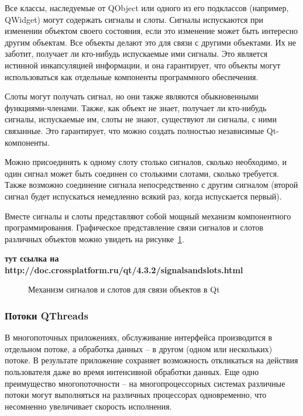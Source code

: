 Все классы, наследуемые от QObject или одного из его подклассов (например, QWidget) могут содержать сигналы и слоты. Сигналы испускаются при изменении объектом своего состояния, если это изменение может быть интересно другим объектам. Все объекты делают это для связи с другими объектами. Их не заботит, получает ли кто-нибудь испускаемые ими сигналы. Это является истинной инкапсуляцией информации, и она гарантирует, что объекты могут использоваться как отдельные компоненты программного обеспечения.

Слоты могут получать сигнал, но они также являются обыкновенными функциями-членами. Также, как объект не знает, получает ли кто-нибудь сигналы, испускаемые им, слоты не знают, существуют ли сигналы, с ними связанные. Это гарантирует, что можно создать полностью независимые Qt-компоненты.

Можно присоединять к одному слоту столько сигналов, сколько необходимо, и один сигнал может быть соединен со столькими слотами, сколько требуется. Также возможно соединение сигнала непосредственно с другим сигналом (второй сигнал будет испускаться немедленно всякий раз, когда испускается первый).

Вместе сигналы и слоты представляют собой мощный механизм компонентного программирования. Графическое представление связи сигналов и слотов различных объектов можно увидеть на рисунке~\ref{signals-slots:signals-slots}.

\textbf{тут ссылка на http://doc.crossplatform.ru/qt/4.3.2/signalsandslots.html}

\begin{figure}[h!]
\caption{ Механизм сигналов и слотов для связи объектов в Qt }
\label{signals-slots:signals-slots}
\end{figure}

\subsubsection{Потоки QThreads}

В многопоточных приложениях, обслуживание интерфейса производится в отдельном потоке, а обработка данных -- в другом (одном или нескольких) потоке. В результате приложение сохраняет возможность откликаться на действия пользователя даже во время интенсивной обработки данных. Еще одно преимущество многопоточности -- на многопроцессорных системах различные потоки могут выполняться на различных процессорах одновременно, что несомненно увеличивает скорость исполнения.

